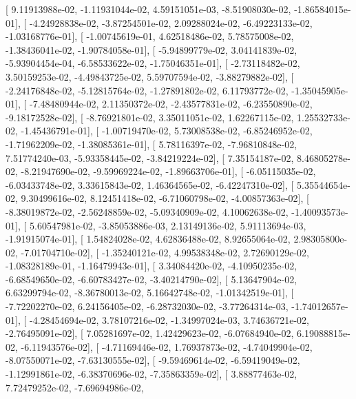\documentclass{article}
\begin{document}
       [  9.11913988e-02,  -1.11931044e-02,   4.59151051e-03,
         -8.51908030e-02,  -1.86584015e-01],
       [ -4.24928838e-02,  -3.87254501e-02,   2.09288024e-02,
         -6.49223133e-02,  -1.03168776e-01],
       [ -1.00745619e-01,   4.62518486e-02,   5.78575008e-02,
         -1.38436041e-02,  -1.90784058e-01],
       [ -5.94899779e-02,   3.04141839e-02,  -5.93904454e-04,
         -6.58533622e-02,  -1.75046351e-01],
       [ -2.73118482e-02,   3.50159253e-02,  -4.49843725e-02,
          5.59707594e-02,  -3.88279882e-02],
       [ -2.24176848e-02,  -5.12815764e-02,  -1.27891802e-02,
          6.11793772e-02,  -1.35045905e-01],
       [ -7.48480944e-02,   2.11350372e-02,  -2.43577831e-02,
         -6.23550890e-02,  -9.18172528e-02],
       [ -8.76921801e-02,   3.35011051e-02,   1.62267115e-02,
          1.25532733e-02,  -1.45436791e-01],
       [ -1.00719470e-02,   5.73008538e-02,  -6.85246952e-02,
         -1.71962209e-02,  -1.38085361e-01],
       [  5.78116397e-02,  -7.96810848e-02,   7.51774240e-03,
         -5.93358445e-02,  -3.84219224e-02],
       [  7.35154187e-02,   8.46805278e-02,  -8.21947690e-02,
         -9.59969224e-02,  -1.89663706e-01],
       [ -6.05115035e-02,  -6.03433748e-02,   3.33615843e-02,
          1.46364565e-02,  -6.42247310e-02],
       [  5.35544654e-02,   9.30499616e-02,   8.12451418e-02,
         -6.71060798e-02,  -4.00857363e-02],
       [ -8.38019872e-02,  -2.56248859e-02,  -5.09340909e-02,
          4.10062638e-02,  -1.40093573e-01],
       [  5.60547981e-02,  -3.85053886e-03,   2.13149136e-02,
          5.91113694e-03,  -1.91915074e-01],
       [  1.54824028e-02,   4.62836488e-02,   8.92655064e-02,
          2.98305800e-02,  -7.01704710e-02],
       [ -1.35240121e-02,   4.99538348e-02,   2.72690129e-02,
         -1.08328189e-01,  -1.16479943e-01],
       [  3.34084420e-02,  -4.10950235e-02,  -6.68549650e-02,
         -6.60783427e-02,  -3.40214790e-02],
       [  5.13647904e-02,   6.63299794e-02,  -8.36780013e-02,
          5.16642748e-02,  -1.01342519e-01],
       [ -7.72202270e-02,   6.24156405e-02,  -6.28732030e-02,
         -3.77264314e-03,  -1.74012657e-01],
       [ -4.28454694e-02,   3.78107216e-02,  -1.34997024e-03,
          3.74636721e-02,  -2.76495091e-02],
       [  7.05281697e-02,   1.42429623e-02,  -6.07684940e-02,
          6.19088815e-02,  -6.11943576e-02],
       [ -4.71169446e-02,   1.76937873e-02,  -4.74049904e-02,
         -8.07550071e-02,  -7.63130555e-02],
       [ -9.59469614e-02,  -6.59419049e-02,  -1.12991861e-02,
         -6.38370696e-02,  -7.35863359e-02],
       [  3.88877463e-02,   7.72479252e-02,  -7.69694986e-02,
\end{document}

